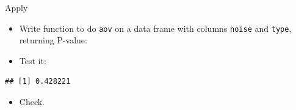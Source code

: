 \documentclass[ignorenonframetext,]{beamer}
\newenvironment{Shaded}{\begin{snugshade}}{\end{snugshade}}
\newcommand{\ControlFlowTok}[1]{\textcolor[rgb]{0.13,0.29,0.53}{\textbf{#1}}}
\newcommand{\DataTypeTok}[1]{\textcolor[rgb]{0.13,0.29,0.53}{#1}}
\newcommand{\FloatTok}[1]{\textcolor[rgb]{0.00,0.00,0.81}{#1}}
\newcommand{\KeywordTok}[1]{\textcolor[rgb]{0.13,0.29,0.53}{\textbf{#1}}}
\newcommand{\NormalTok}[1]{#1}
\newcommand{\OperatorTok}[1]{\textcolor[rgb]{0.81,0.36,0.00}{\textbf{#1}}}
\newcommand{\StringTok}[1]{\textcolor[rgb]{0.31,0.60,0.02}{#1}}
\providecommand{\tightlist}{%
  \setlength{\itemsep}{0pt}\setlength{\parskip}{0pt}}
\begin{document}
\begin{frame}[fragile]{Apply}
\protect\hypertarget{apply}{}

\begin{itemize}
\tightlist
\item
  Write function to do \texttt{aov} on a data frame with columns
  \texttt{noise} and \texttt{type}, returning P-value:
\end{itemize}

\begin{Shaded}
\end{Shaded}

\begin{itemize}
\tightlist
\item
  Test it:
\end{itemize}

\begin{Shaded}
\end{Shaded}

\begin{verbatim}
## [1] 0.428221
\end{verbatim}

\begin{itemize}
\tightlist
\item
  Check.
\end{itemize}

\end{frame}
\end{document}
